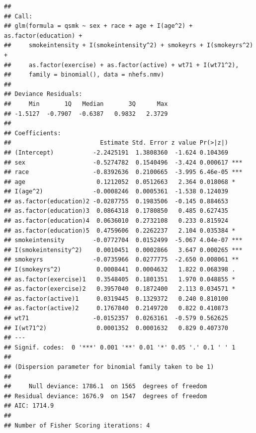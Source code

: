 \documentclass[
  10pt,
]{book}
\newenvironment{Shaded}{\begin{snugshade}}{\end{snugshade}}
\newcommand{\AttributeTok}[1]{\textcolor[rgb]{0.77,0.63,0.00}{#1}}
\newcommand{\DecValTok}[1]{\textcolor[rgb]{0.00,0.00,0.81}{#1}}
\newcommand{\FunctionTok}[1]{\textcolor[rgb]{0.00,0.00,0.00}{#1}}
\newcommand{\NormalTok}[1]{#1}
\newcommand{\OtherTok}[1]{\textcolor[rgb]{0.56,0.35,0.01}{#1}}
\newcommand{\SpecialCharTok}[1]{\textcolor[rgb]{0.00,0.00,0.00}{#1}}
\newcommand{\StringTok}[1]{\textcolor[rgb]{0.31,0.60,0.02}{#1}}
\begin{document}
\begin{verbatim}
## 
## Call:
## glm(formula = qsmk ~ sex + race + age + I(age^2) + as.factor(education) + 
##     smokeintensity + I(smokeintensity^2) + smokeyrs + I(smokeyrs^2) + 
##     as.factor(exercise) + as.factor(active) + wt71 + I(wt71^2), 
##     family = binomial(), data = nhefs.nmv)
## 
## Deviance Residuals: 
##     Min       1Q   Median       3Q      Max  
## -1.5127  -0.7907  -0.6387   0.9832   2.3729  
## 
## Coefficients:
##                         Estimate Std. Error z value Pr(>|z|)    
## (Intercept)           -2.2425191  1.3808360  -1.624 0.104369    
## sex                   -0.5274782  0.1540496  -3.424 0.000617 ***
## race                  -0.8392636  0.2100665  -3.995 6.46e-05 ***
## age                    0.1212052  0.0512663   2.364 0.018068 *  
## I(age^2)              -0.0008246  0.0005361  -1.538 0.124039    
## as.factor(education)2 -0.0287755  0.1983506  -0.145 0.884653    
## as.factor(education)3  0.0864318  0.1780850   0.485 0.627435    
## as.factor(education)4  0.0636010  0.2732108   0.233 0.815924    
## as.factor(education)5  0.4759606  0.2262237   2.104 0.035384 *  
## smokeintensity        -0.0772704  0.0152499  -5.067 4.04e-07 ***
## I(smokeintensity^2)    0.0010451  0.0002866   3.647 0.000265 ***
## smokeyrs              -0.0735966  0.0277775  -2.650 0.008061 ** 
## I(smokeyrs^2)          0.0008441  0.0004632   1.822 0.068398 .  
## as.factor(exercise)1   0.3548405  0.1801351   1.970 0.048855 *  
## as.factor(exercise)2   0.3957040  0.1872400   2.113 0.034571 *  
## as.factor(active)1     0.0319445  0.1329372   0.240 0.810100    
## as.factor(active)2     0.1767840  0.2149720   0.822 0.410873    
## wt71                  -0.0152357  0.0263161  -0.579 0.562625    
## I(wt71^2)              0.0001352  0.0001632   0.829 0.407370    
## ---
## Signif. codes:  0 '***' 0.001 '**' 0.01 '*' 0.05 '.' 0.1 ' ' 1
## 
## (Dispersion parameter for binomial family taken to be 1)
## 
##     Null deviance: 1786.1  on 1565  degrees of freedom
## Residual deviance: 1676.9  on 1547  degrees of freedom
## AIC: 1714.9
## 
## Number of Fisher Scoring iterations: 4
\end{verbatim}

\begin{Shaded}
\end{Shaded}
\end{document}

